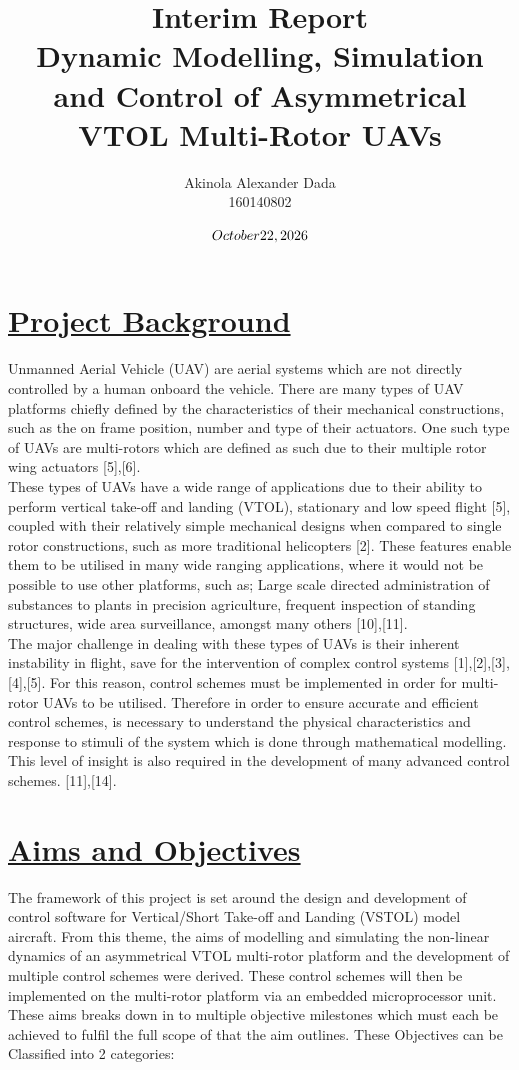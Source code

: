 \documentclass[12pt,a4paper,twoside]{report}
\title{Interim Report \\ Dynamic Modelling, Simulation and Control of Asymmetrical VTOL Multi-Rotor UAVs}
\author{Akinola Alexander Dada \\ 160140802}
\date{$\today$}
\begin{document}
		
	\maketitle
	\newpage
	\section*{\underline{Project Background}}
	 
		Unmanned Aerial Vehicle (UAV) are aerial systems which are not directly controlled by a human onboard the vehicle. There are many types of UAV platforms chiefly defined by the characteristics of their mechanical constructions, such as the on frame position, number and type of their actuators. One such type of UAVs are multi-rotors which are defined as such due to their multiple rotor wing actuators [5],[6]. 
		\\
		These types of UAVs have a wide range of applications due to their ability to perform vertical take-off and landing (VTOL), stationary and low speed flight [5], coupled with their relatively simple mechanical designs when compared to single rotor constructions, such as more traditional helicopters [2]. These features enable them to be utilised in many wide ranging applications, where it would not be possible to use other platforms, such as; Large scale directed administration of substances to plants in precision agriculture, frequent inspection of standing structures, wide area surveillance, amongst many others [10],[11].
		\\
		The major challenge in dealing with these types of UAVs is their inherent instability in flight, save for the intervention of complex control systems [1],[2],[3],[4],[5]. For this reason, control schemes must be implemented in order for multi-rotor UAVs to be utilised. Therefore in order to ensure accurate and efficient control schemes, is necessary to understand the physical characteristics and response to stimuli of the system which is done through mathematical modelling. This level of insight is also required in the development of many advanced control schemes. [11],[14].
		
	\section*{\underline{Aims and Objectives}}
		
		The framework of this project is set around the design and development of control software for Vertical/Short Take-off and Landing (VSTOL) model aircraft. From this theme, the aims of modelling and simulating the non-linear dynamics of an asymmetrical VTOL multi-rotor platform and the development of multiple control schemes were derived. These control schemes will then be implemented on the multi-rotor platform via an embedded microprocessor unit. 
		\\
		These aims breaks down in to multiple objective milestones which must each be achieved to fulfil the full scope of that the aim outlines. These Objectives can be Classified into 2 categories:
\end{document}
